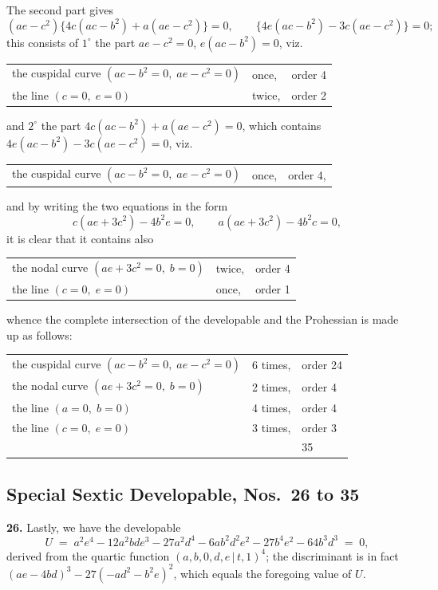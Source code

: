 \documentclass[11pt,a4paper]{article}
\providecommand{\mid}{\,|\,}
\begin{document}
The second part gives
\[
(ae - c^2)\bigl\{4c(ac - b^2) + a(ae - c^2)\bigr\} = 0,\qquad \bigl\{4e(ac - b^2) - 3c(ae - c^2)\bigr\} = 0;
\]
this consists of $1^\circ$ the part $ae - c^2 = 0$, $e(ac - b^2) = 0$, viz.
\begin{center}
\begin{tabular}{lll}
the cuspidal curve $(ac - b^2 = 0,\;ae - c^2 = 0)$ & once, & order 4\\
the line $(c = 0,\;e = 0)$ & twice, & order 2
\end{tabular}
\end{center}
and $2^\circ$ the part $4c(ac - b^2) + a(ae - c^2) = 0$, which contains $4e(ac - b^2) - 3c(ae - c^2) = 0$, viz.
\begin{center}
\begin{tabular}{lll}
the cuspidal curve $(ac - b^2 = 0,\;ae - c^2 = 0)$ & once, & order 4,
\end{tabular}
\end{center}
and by writing the two equations in the form
\[
c(ae + 3c^2) - 4b^2 e = 0,\qquad a(ae + 3c^2) - 4b^2 c = 0,
\]
it is clear that it contains also
\begin{center}
\begin{tabular}{lll}
the nodal curve $(ae + 3c^2 = 0,\;b = 0)$ & twice, & order 4\\
the line $(c = 0,\;e = 0)$ & once, & order 1
\end{tabular}
\end{center}
whence the complete intersection of the developable and the Prohessian is made up as follows:
\begin{center}
\begin{tabular}{lll}
the cuspidal curve $(ac - b^2 = 0,\;ae - c^2 = 0)$ & 6 times, & order 24\\
the nodal curve $(ae + 3c^2 = 0,\;b = 0)$ & 2 times, & order 4\\
the line $(a = 0,\;b = 0)$ & 4 times, & order 4\\
the line $(c = 0,\;e = 0)$ & 3 times, & order 3\\
\hline
& & 35
\end{tabular}
\end{center}

\medskip

\subsection*{Special Sextic Developable, Nos.~26 to 35}

\textbf{26.} Lastly, we have the developable
\[
U \;=\; a^2 e^4 - 12 a^2 bde^3 - 27 a^2 d^4 - 6 a b^2 d^2 e^2 - 27 b^4 e^2 - 64 b^3 d^3 \;=\; 0,
\]
derived from the quartic function $(a,b,0,d,e \mid t,1)^4$; the discriminant is in fact $(ae - 4bd)^3 - 27(-ad^2 - b^2 e)^2$, which equals the foregoing value of $U$.
\end{document}
